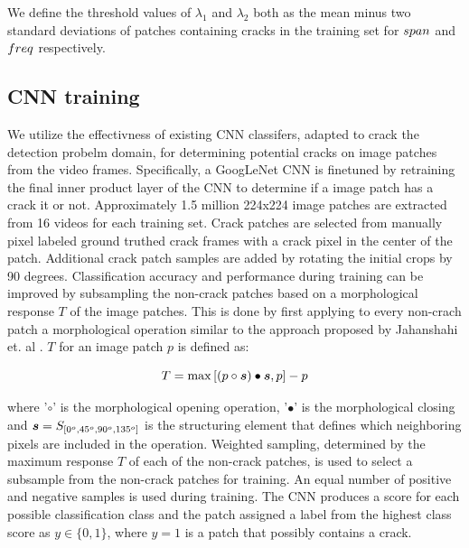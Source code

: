                  We define the threshold values of $\lambda_1$ and $\lambda_2$ both as the mean minus two standard deviations of patches containing cracks in the training set for $span$ and $freq$ respectively. 
        
    


   
    
    
    
             



    \subsection{CNN training}
    \label{training}
        We utilize the effectivness of existing CNN classifers, adapted to crack the detection probelm domain, for determining potential cracks on image patches from the video frames. Specifically, a GoogLeNet CNN  is finetuned by retraining the final inner product layer of the CNN to determine if a image patch has a crack it or not. Approximately 1.5 million 224x224 image patches are extracted from 16 videos for each training set. Crack patches are selected from manually pixel labeled ground truthed crack frames with a crack pixel in the center of the patch. Additional crack patch samples are added by rotating the initial crops by  90 degrees. 
        Classification accuracy and performance during training can be improved by subsampling the non-crack patches based on a morphological response $T$ of the image patches. This is done by first applying to every non-crach patch a morphological operation similar to the approach proposed by Jahanshahi et. al \cite{jahanshahi2013}. $T$ for an image patch $p$ is defined as:
        
        \begin{equation}
                T = \max{[(p \circ \boldsymbol{s}) \bullet \boldsymbol{s}, p}] - p 
        \end{equation}
        
        where '$\circ$' is the morphological opening operation, '$\bullet$' is the morphological closing and $\boldsymbol{s} = S_{[0^o,45^o,90^o,135^o]}$ is the structuring element that defines which neighboring pixels are included in the operation. Weighted sampling, determined by the maximum response $T$ of each of the non-crack patches, is used to select a subsample from the non-crack patches for training. An equal number of positive and negative samples is used during training. The CNN produces a score for each possible classification class and the patch assigned a label from the highest class score as $y \in \{0,1\}$, where $y=1$ is a patch that possibly contains a crack.  
        
